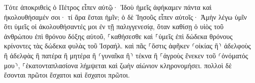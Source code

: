 \documentclass{openreader}
\begin{document}
Τότε ἀποκριθεὶς ὁ Πέτρος εἶπεν αὐτῷ· Ἰδοὺ ἡμεῖς ἀφήκαμεν πάντα καὶ ἠκολουθήσαμέν σοι· τί ἄρα ἔσται ἡμῖν; 
ὁ δὲ Ἰησοῦς εἶπεν αὐτοῖς· Ἀμὴν λέγω ὑμῖν ὅτι ὑμεῖς οἱ ἀκολουθήσαντές μοι ἐν τῇ παλιγγενεσίᾳ, ὅταν καθίσῃ ὁ υἱὸς τοῦ ἀνθρώπου ἐπὶ θρόνου δόξης αὐτοῦ, ⸀καθήσεσθε καὶ ⸀ὑμεῖς ἐπὶ δώδεκα θρόνους κρίνοντες τὰς δώδεκα φυλὰς τοῦ Ἰσραήλ. 
καὶ πᾶς ⸀ὅστις ἀφῆκεν ⸂οἰκίας ἢ⸃ ἀδελφοὺς ἢ ἀδελφὰς ἢ πατέρα ἢ μητέρα ἢ ⸂γυναῖκα ἢ⸃ τέκνα ἢ ⸀ἀγροὺς ἕνεκεν τοῦ ⸂ὀνόματός μου⸃, ⸀ἑκατονταπλασίονα λήμψεται καὶ ζωὴν αἰώνιον κληρονομήσει. 
πολλοὶ δὲ ἔσονται πρῶτοι ἔσχατοι καὶ ἔσχατοι πρῶτοι. 
\end{document}
